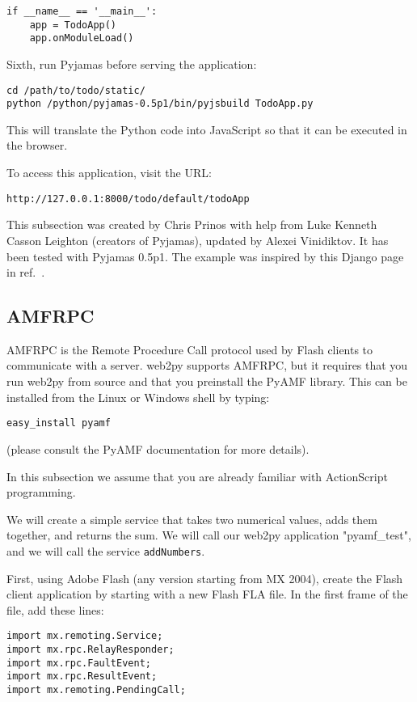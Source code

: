 \documentclass[justified,sixbynine,notoc]{tufte-book}
\def\ft{\small\tt}
\def\inxx#1{\index{#1}}
\begin{document}
\begin{fullwidth}
\begin{lstlisting}
if __name__ == '__main__':
    app = TodoApp()
    app.onModuleLoad()
\end{lstlisting}

Sixth, run Pyjamas before serving the application:
\begin{lstlisting}
cd /path/to/todo/static/
python /python/pyjamas-0.5p1/bin/pyjsbuild TodoApp.py
\end{lstlisting}

This will translate the Python code into JavaScript so that it can be executed in the browser.

To access this application, visit the URL:

\begin{lstlisting}[keywords={}]
http://127.0.0.1:8000/todo/default/todoApp
\end{lstlisting}

This subsection was created by Chris Prinos with help from Luke Kenneth Casson Leighton (creators of Pyjamas), updated by Alexei Vinidiktov. It has been tested with Pyjamas 0.5p1. The example was inspired by this Django page in ref.~\cite{blogspot1}.

\goodbreak\subsection{AMFRPC}

\inxx{PyAMF} \inxx{Adobe Flash}

AMFRPC is the Remote Procedure Call protocol used by Flash clients to communicate with a server. web2py supports AMFRPC, but it requires that you run web2py from source and that you preinstall the PyAMF library. This can be installed from the Linux or Windows shell by typing:
\begin{lstlisting}
easy_install pyamf
\end{lstlisting}

(please consult the PyAMF documentation for more details).

In this subsection we assume that you are already familiar with
ActionScript programming.

We will create a simple service that takes two numerical values, adds them together, and returns the sum. We will call our web2py application "pyamf\_test", and we will call the service {\ft addNumbers}.

First, using Adobe Flash (any version starting from MX 2004), create the Flash client application by starting with a new Flash FLA file. In the first frame of the file, add these lines:
\begin{lstlisting}
import mx.remoting.Service;
import mx.rpc.RelayResponder;
import mx.rpc.FaultEvent;
import mx.rpc.ResultEvent;
import mx.remoting.PendingCall;


\end{lstlisting}
\end{fullwidth}
\end{document}
